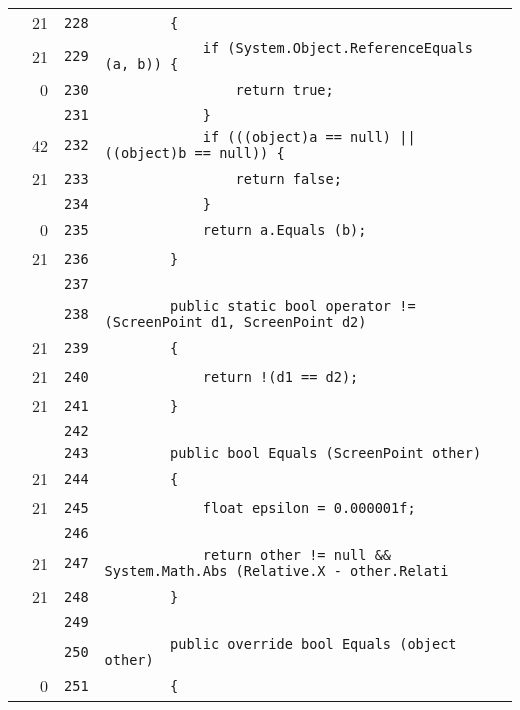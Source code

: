 \documentclass[a4paper,10pt]{article}
\begin{document}
\begin{longtable}[l]{lrrl}
\cellcolor{green} & 21 & \verb~228~ & \verb~        {~\\
\cellcolor{green} & 21 & \verb~229~ & \verb~            if (System.Object.ReferenceEquals (a, b)) {~\\
\cellcolor{red} & 0 & \verb~230~ & \verb~                return true;~\\
\cellcolor{gray} &  & \verb~231~ & \verb~            }~\\
\cellcolor{green} & 42 & \verb~232~ & \verb~            if (((object)a == null) || ((object)b == null)) {~\\
\cellcolor{green} & 21 & \verb~233~ & \verb~                return false;~\\
\cellcolor{gray} &  & \verb~234~ & \verb~            }~\\
\cellcolor{red} & 0 & \verb~235~ & \verb~            return a.Equals (b);~\\
\cellcolor{green} & 21 & \verb~236~ & \verb~        }~\\
\cellcolor{gray} &  & \verb~237~ & \verb~~\\
\cellcolor{gray} &  & \verb~238~ & \verb~        public static bool operator != (ScreenPoint d1, ScreenPoint d2)~\\
\cellcolor{green} & 21 & \verb~239~ & \verb~        {~\\
\cellcolor{green} & 21 & \verb~240~ & \verb~            return !(d1 == d2);~\\
\cellcolor{green} & 21 & \verb~241~ & \verb~        }~\\
\cellcolor{gray} &  & \verb~242~ & \verb~~\\
\cellcolor{gray} &  & \verb~243~ & \verb~        public bool Equals (ScreenPoint other)~\\
\cellcolor{green} & 21 & \verb~244~ & \verb~        {~\\
\cellcolor{green} & 21 & \verb~245~ & \verb~            float epsilon = 0.000001f;~\\
\cellcolor{gray} &  & \verb~246~ & \verb~~\\
\cellcolor{green} & 21 & \verb~247~ & \verb~            return other != null && System.Math.Abs (Relative.X - other.Relati~\\
\cellcolor{green} & 21 & \verb~248~ & \verb~        }~\\
\cellcolor{gray} &  & \verb~249~ & \verb~~\\
\cellcolor{gray} &  & \verb~250~ & \verb~        public override bool Equals (object other)~\\
\cellcolor{red} & 0 & \verb~251~ & \verb~        {~\\

\end{longtable}
\end{document}
